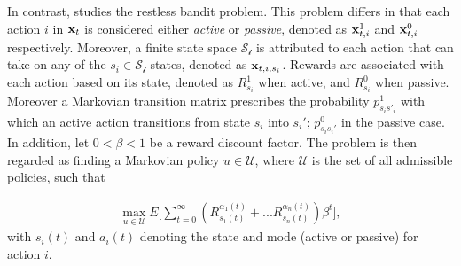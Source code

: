 In contrast, \citep{hazan} studies the restless bandit problem. This problem differs in that each action $i$ in ${\bf x}_{t}$ is considered either \textit{active} or \textit{passive}, denoted as ${\bf x}_{t,i}^1$ and ${\bf x}_{t,i}^0$ respectively. Moreover, a finite state space $\mathcal{S_i}$ is attributed to each action that can take on any of the $s_i\in \mathcal{S_i}$ states, denoted as ${\bf x}_{t, i, s_i}$. Rewards are associated with each action based on its state, denoted as $R_{s_i}^1$ when active, and $R_{s_i}^0$ when passive. Moreover a Markovian transition matrix prescribes the probability $p^1_{s_is'_i}$ with which an active action transitions from state $s_i$ into $s_i'$; $p^0_{s_is_i'}$ in the passive case. In addition, let $0<\beta<1$ be a reward discount factor. The problem is then regarded as finding a Markovian policy $u\in \mathcal{U}$, where $\mathcal{U}$ is the set of all admissible policies, such that 

\begin{align}
	\max_{u\in\mathcal{U}}E\bigg[\sum_{t=0}^\infty(R_{s_1(t)}^{\alpha_1(t)}+...R_{s_n(t)}^{\alpha_n(t)})\beta^t\bigg],
\end{align}
with $s_i(t)$ and $a_i(t)$ denoting the state and mode (active or passive) for action $i$.